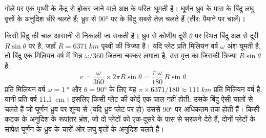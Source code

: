 \begin{omfigure}

{\small गोले पर एक  पृथ्वी के केंद्र से होकर जाने वाले अक्ष के परितः घूमती है।
घूर्णन ध्रुव के पास के बिंदु लघु वृत्तों के अनुदिश धीरे चलते हैं;
ध्रुव से \ang{90} पर के बिंदु सबसे तेज़ चलते हैं (तीर: पैमाने पर चालें)।}
\end{omfigure}

किसी बिंदु की चाल आसानी से निकाली जा सकती है। ध्रुव से कोणीय दूरी
$\theta$ पर स्थित बिंदु अक्ष से दूरी $R\sin\theta$ पर है, जहाँ
$R = \qty{6371}{km}$ पृथ्वी की त्रिज्या है। यदि प्लेट प्रति मिलियन वर्ष $\omega$
अंश घूमती है, तो बिंदु एक मिलियन वर्ष में भिन्न $\omega/360$ जितना चक्कर लगाता है, उस
वृत्त का जिसकी त्रिज्या $R\sin\theta$ है:
\[
  v = \frac{\omega}{360} \times 2\pi R\sin\theta
    = \frac{\pi\,\omega}{180}\,R\sin\theta .
\]
प्रति मिलियन वर्ष $\omega = \qty{1}{\degree}$ और $\theta = \ang{90}$ के लिए
यह $\pi \times 6371/180 \approx \qty{111}{km}$ प्रति मिलियन वर्ष है,
यानी प्रति वर्ष \qty{11.1}{cm}। इसलिए किसी प्लेट की कोई एक चाल नहीं होती: उसके बिंदु
ऐसी चालों से चलते हैं जो घूर्णन ध्रुव पर शून्य से (यदि ध्रुव
प्लेट पर हो) उससे \ang{90} पर अधिकतम तक होती हैं। किसी कटक के अनुदिश के रूपांतर भ्रंश,
जो दो प्लेटों को एक-दूसरे के पास से सरकने देते हैं, दोनों प्लेटों के सापेक्ष घूर्णन के
ध्रुव के चारों ओर लघु वृत्तों के अनुदिश चलते हैं।

